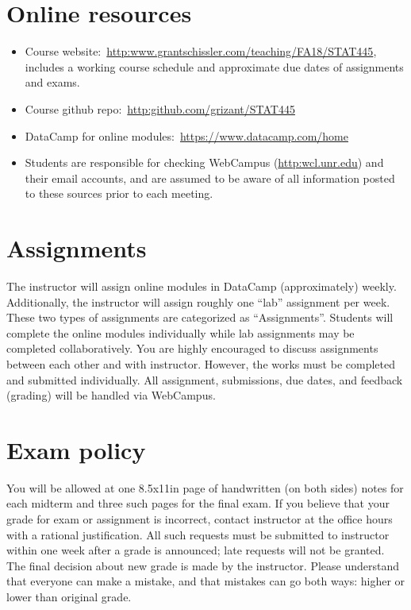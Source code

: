 \documentclass[11pt,onecolumn]{article}
\begin{document}
\section*{Online resources}
\begin{itemize}
\item Course website:~\url{http:www.grantschissler.com/teaching/FA18/STAT445}, includes a working course schedule and approximate due dates of assignments and exams.
\item Course github repo:~\url{http:github.com/grizant/STAT445}
  \item DataCamp for online modules:~\url{https://www.datacamp.com/home}
\item Students are responsible for checking WebCampus (\url{http:wcl.unr.edu}) and their email accounts, and are assumed to be aware of all information posted to these sources prior to each meeting.
\end{itemize}

\section*{Assignments}
The instructor will assign online modules in DataCamp (approximately) weekly. Additionally, the instructor will assign roughly one ``lab'' assignment per week. These two types of assignments are categorized as ``Assignments''. Students will complete the online modules individually while lab assignments may be completed collaboratively. You are highly encouraged to discuss assignments between each other and with instructor. However, the works must be completed and submitted individually. All assignment, submissions, due dates, and feedback (grading) will be handled via WebCampus.

\section*{Exam policy} You will be allowed at one 8.5x11in page of handwritten (on both sides) notes for each midterm and three such pages for the final exam. If you believe that your grade for exam or assignment is incorrect, contact instructor at the office hours with a rational justification. All such requests must be submitted to instructor within one week after a grade is announced; late requests will not be granted. The final decision about new grade is made by the instructor. Please understand that everyone can make a mistake, and that mistakes can go both ways: higher or lower than original grade.
\end{document}

